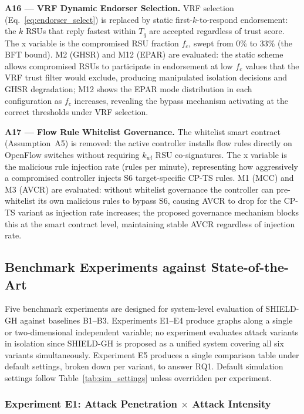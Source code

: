 \documentclass[12pt, a4paper]{report}
\newcommand{\mypar}{\vspace{0.8em}\noindent}
\begin{document}
\mypar
\textbf{A16 --- VRF Dynamic Endorser Selection.}
VRF selection (Eq.~\eqref{eq:endorser_select}) is replaced by static
first-$k$-to-respond endorsement: the $k$ RSUs that reply fastest
within $T_q$ are accepted regardless of trust score. The x variable is
the compromised RSU fraction $f_c$, swept from 0\% to 33\% (the BFT
bound). M2 (GHSR) and M12 (EPAR) are evaluated: the static scheme
allows compromised RSUs to participate in endorsement at low $f_c$
values that the VRF trust filter would exclude, producing manipulated
isolation decisions and GHSR degradation; M12 shows the EPAR mode
distribution in each configuration as $f_c$ increases, revealing the
bypass mechanism activating at the correct thresholds under VRF selection.

\mypar
\textbf{A17 --- Flow Rule Whitelist Governance.}
The whitelist smart contract (Assumption~A5) is removed: the active
controller installs flow rules directly on OpenFlow switches without
requiring $k_{wl}$ RSU co-signatures. The x variable is the malicious
rule injection rate (rules per minute), representing how aggressively a
compromised controller injects S6 target-specific CP-TS rules. M1 (MCC)
and M3 (AVCR) are evaluated: without whitelist governance the controller
can pre-whitelist its own malicious rules to bypass S6, causing AVCR to
drop for the CP-TS variant as injection rate increases; the proposed
governance mechanism blocks this at the smart contract level, maintaining
stable AVCR regardless of injection rate.

\subsection{Benchmark Experiments against State-of-the-Art}
\label{sec:benchmark_experiments}

Five benchmark experiments are designed for system-level evaluation of
SHIELD-GH against baselines B1--B3. Experiments E1--E4 produce graphs
along a single or two-dimensional independent variable; no experiment
evaluates attack variants in isolation since SHIELD-GH is proposed as
a unified system covering all six variants simultaneously. Experiment E5
produces a single comparison table under default settings, broken down
per variant, to answer RQ1. Default simulation settings follow
Table~\ref{tab:sim_settings} unless overridden per experiment.

\mypar
\subsubsection{Experiment E1: Attack Penetration $\times$ Attack Intensity}
\label{sec:exp1}
\end{document}

